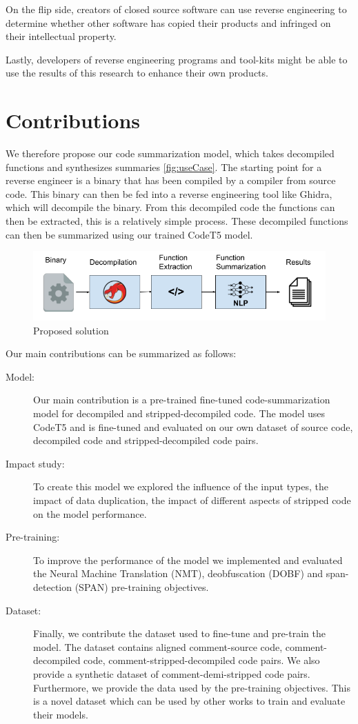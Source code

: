 On the flip side, creators of closed source software can use reverse engineering to determine whether other software has copied their products and infringed on their intellectual property.

Lastly, developers of reverse engineering programs and tool-kits might be able to use the results of this research to enhance their own products. 

\section{Contributions}
We therefore propose our code summarization model, which takes decompiled functions and synthesizes summaries \ref{fig:useCase}. The starting point for a reverse engineer is a binary that has been compiled by a compiler from source code. This binary can then be fed into a reverse engineering tool like Ghidra, which will decompile the binary. From this decompiled code the functions can then be extracted, this is a relatively simple process. These decompiled functions can then be summarized using our trained CodeT5 \cite{CodeT5} model.

\label{fig:useCase}
\begin{figure}[htb]
    \centering
    \includegraphics[width=\textwidth,height=\textheight,keepaspectratio]{img/UseCase.png}
    \caption{Proposed solution}
\end{figure}

Our main contributions can be summarized as follows:
\begin{description}
 \item[Model:] Our main contribution is a pre-trained fine-tuned code-summarization model for decompiled and stripped-decompiled code. The model uses CodeT5 and is fine-tuned and evaluated on our own dataset of source code, decompiled code and stripped-decompiled code pairs. 
 \item[Impact study:] To create this model we explored the influence of the input types, the impact of data duplication, the impact of different aspects of stripped code on the model performance.
 \item[Pre-training:] To improve the performance of the model we implemented and evaluated the Neural Machine Translation (NMT), deobfuscation (DOBF) and span-detection (SPAN) pre-training objectives. 
 \item[Dataset:] Finally, we contribute the dataset used to fine-tune and pre-train the model. The dataset contains aligned comment-source code, comment-decompiled code, comment-stripped-decompiled code pairs. We also provide a synthetic dataset of comment-demi-stripped code pairs. Furthermore, we provide the data used by the pre-training objectives. This is a novel dataset which can be used by other works to train and evaluate their models.
\end{description}

